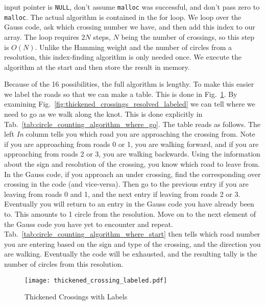 \documentclass{article}
\theoremstyle{plain}
\begin{document}
        input pointer is \texttt{NULL}, don't assume \texttt{malloc} was
        successful, and don't pass zero to \texttt{malloc}. The actual algorithm
        is contained in the for loop. We loop over the Gauss code, ask which
        crossing number we have, and then add this index to our array. The
        loop requires $2N$ steps, $N$ being the number of crossings, so this
        step is $O(N)$. Unlike the Hamming weight and the number of circles
        from a resolution, this index-finding algorithm is only needed once. We
        execute the algorithm at the start and then store the result in
        memory.
        \par\hfill\par
        Because of the 16 possibilities, the full algorithm is lengthy. To make
        this easier we label the roads so that we can make a table. This is
        done in Fig.~\ref{fig:thickened_crossings_labeled}. By examining
        Fig.~\ref{fig:thickened_crossings_resolved_labeled} we can tell where
        we need to go as we walk along the knot. This is done explicitly in
        Tab.~\ref{tab:circle_counting_algorithm_where_go}. The table reads as follows.
        The left \textit{In} column tells you which road you are approaching the
        crossing from. Note if you are approaching from roads 0 or 1, you are
        walking forward, and if you are approaching from roads 2 or 3, you are
        walking backwards. Using the information about the sign and resolution
        of the crossing, you know which road to leave from. In the Gauss code,
        if you approach an under crossing, find the corresponding over crossing
        in the code (and vice-versa). Then go to the previous entry if you are
        leaving from roads 0 and 1, and the next entry if leaving from roads
        2 or 3. Eventually you will return to an entry in
        the Gauss code you have already been to. This amounts to 1 circle from
        the resolution. Move on to the next element of the Gauss code you have
        yet to encounter and repeat. Tab.~\ref{tab:circle_counting_algorithm_where_start}
        then tells which road number you are entering based on the sign and type
        of the crossing, and the direction you are walking. Eventually the code
        will be exhausted, and the resulting tally is the number of
        circles from this resolution.
        \begin{figure}
            \centering
            \texttt{[image: thickened\_crossing\_labeled.pdf]}
            \caption{Thickened Crossings with Labels}
            \label{fig:thickened_crossings_labeled}
        \end{figure}
\end{document}
